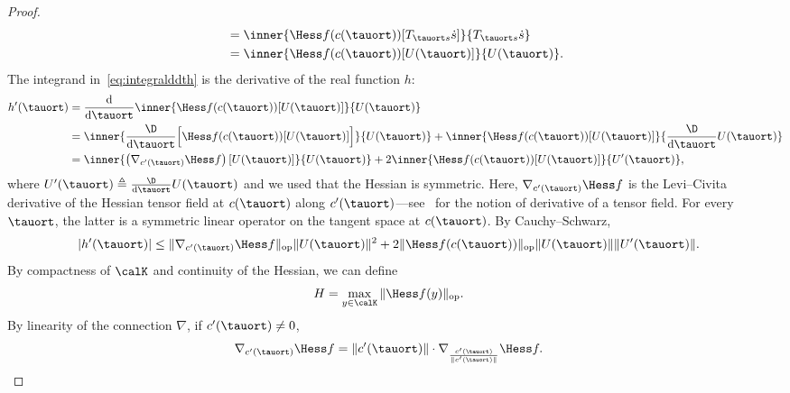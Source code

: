 \begin{proof}
\begin{align*}
	& = \inner{\Hess f(c(\tauort))[T_{\tauort s} \dot s]}{T_{\tauort s} \dot s} \\
	& = \inner{\Hess f(c(\tauort))[U(\tauort)]}{U(\tauort)}.
	\end{align*}
	The integrand in~\eqref{eq:integralddth} is the derivative of the real function $h$:
	\begin{align*}
	h'(\tauort) & = \frac{\mathrm{d}}{\mathrm{d}\tauort} \inner{\Hess f(c(\tauort))[U(\tauort)]}{U(\tauort)} \\
	& = \inner{\frac{\D}{\mathrm{d}\tauort}\Big[\Hess f(c(\tauort))[U(\tauort)]\Big]}{U(\tauort)} + \inner{\Hess f(c(\tauort))[U(\tauort)]}{\frac{\D}{\mathrm{d}\tauort} U(\tauort)} \\
	& = \inner{\left( \nabla_{c'(\tauort)} \Hess f \right)[U(\tauort)]}{U(\tauort)} + 2\inner{\Hess f(c(\tauort))[U(\tauort)]}{U'(\tauort)},
	\end{align*}
	where $U'(\tauort) \triangleq \frac{\D}{\mathrm{d}\tauort} U(\tauort)$ and we used that the Hessian is symmetric. Here, $\nabla_{c'(\tauort)} \Hess f$ is the Levi--Civita derivative of the Hessian tensor field at $c(\tauort)$ along $c'(\tauort)$---see~\cite[Def.~4.5.7, p102]{dC92}
	for the notion of derivative of a tensor field. For every $\tauort$, the latter is a symmetric linear operator on the tangent space at $c(\tauort)$. By Cauchy--Schwarz,
	\begin{align*}
	|h'(\tauort)| & \leq \|\nabla_{c'(\tauort)} \Hess f\|_{\mathrm{op}} \|U(\tauort)\|^2 + 2 \|\Hess f(c(\tauort))\|_{\mathrm{op}} \|U(\tauort)\| \|U'(\tauort)\|.
	\end{align*}
	By compactness of $\calK$ and continuity of the Hessian, we can define
	\begin{align*}
		H & = \max_{y \in \calK} \|\Hess f(y)\|_{\mathrm{op}}.
	\end{align*}
	By linearity of the connection $\nabla$, if $c'(\tauort) \neq 0$,
	\begin{align*}
	\nabla_{c'(\tauort)} \Hess f & = \|c'(\tauort)\| \cdot \nabla_{\frac{c'(\tauort)}{\|c'(\tauort)\|}} \Hess f.
	\end{align*}

\end{proof}
